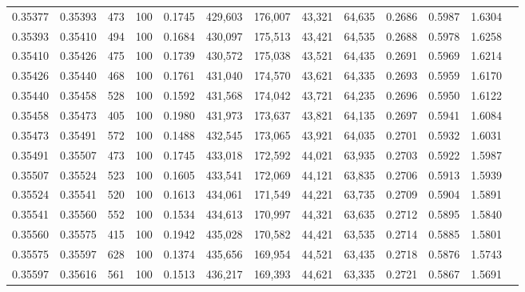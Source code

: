 \begin{tabular}{rrrrrrrrrrrrr}
0.35377 & 0.35393 &   473 & 100 &                                     0.1745 & 429,603 & 176,007 &  43,321 &  64,635 & 0.2686 & 0.5987 & 1.6304 \\
0.35393 & 0.35410 &   494 & 100 &                                     0.1684 & 430,097 & 175,513 &  43,421 &  64,535 & 0.2688 & 0.5978 & 1.6258 \\
0.35410 & 0.35426 &   475 & 100 &                                     0.1739 & 430,572 & 175,038 &  43,521 &  64,435 & 0.2691 & 0.5969 & 1.6214 \\
0.35426 & 0.35440 &   468 & 100 &                                     0.1761 & 431,040 & 174,570 &  43,621 &  64,335 & 0.2693 & 0.5959 & 1.6170 \\
0.35440 & 0.35458 &   528 & 100 &                                     0.1592 & 431,568 & 174,042 &  43,721 &  64,235 & 0.2696 & 0.5950 & 1.6122 \\
0.35458 & 0.35473 &   405 & 100 &                                     0.1980 & 431,973 & 173,637 &  43,821 &  64,135 & 0.2697 & 0.5941 & 1.6084 \\
0.35473 & 0.35491 &   572 & 100 &                                     0.1488 & 432,545 & 173,065 &  43,921 &  64,035 & 0.2701 & 0.5932 & 1.6031 \\
0.35491 & 0.35507 &   473 & 100 &                                     0.1745 & 433,018 & 172,592 &  44,021 &  63,935 & 0.2703 & 0.5922 & 1.5987 \\
0.35507 & 0.35524 &   523 & 100 &                                     0.1605 & 433,541 & 172,069 &  44,121 &  63,835 & 0.2706 & 0.5913 & 1.5939 \\
0.35524 & 0.35541 &   520 & 100 &                                     0.1613 & 434,061 & 171,549 &  44,221 &  63,735 & 0.2709 & 0.5904 & 1.5891 \\
0.35541 & 0.35560 &   552 & 100 &                                     0.1534 & 434,613 & 170,997 &  44,321 &  63,635 & 0.2712 & 0.5895 & 1.5840 \\
0.35560 & 0.35575 &   415 & 100 &                                     0.1942 & 435,028 & 170,582 &  44,421 &  63,535 & 0.2714 & 0.5885 & 1.5801 \\
0.35575 & 0.35597 &   628 & 100 &                                     0.1374 & 435,656 & 169,954 &  44,521 &  63,435 & 0.2718 & 0.5876 & 1.5743 \\
0.35597 & 0.35616 &   561 & 100 &                                     0.1513 & 436,217 & 169,393 &  44,621 &  63,335 & 0.2721 & 0.5867 & 1.5691 \\

\end{tabular}
